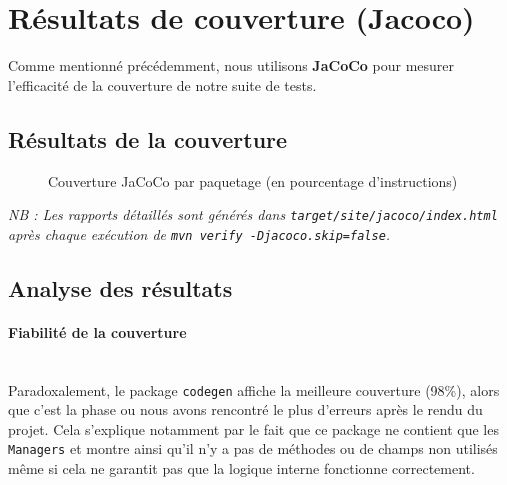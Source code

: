 \section{Résultats de couverture (Jacoco)}
\noindent
Comme mentionné précédemment, nous utilisons \textbf{JaCoCo} pour mesurer l'efficacité de la couverture de notre suite de tests. 

\subsection{Résultats de la couverture}
\begin{figure}[H]
    \centering
    \caption{Couverture JaCoCo par paquetage (en pourcentage d'instructions)}
\end{figure}



\noindent
\textit{NB : Les rapports détaillés sont générés dans \texttt{target/site/jacoco/index.html} après chaque exécution de \texttt{mvn verify -Djacoco.skip=false}.}

\subsection{Analyse des résultats}

\paragraph*{Fiabilité de la couverture} \mbox{} \\
\noindent
Paradoxalement, le package \texttt{codegen} affiche la meilleure couverture (98\%), alors que c'est la phase ou nous avons rencontré le plus d'erreurs après le rendu du projet. Cela s'explique notamment par le fait que ce package ne contient que les \texttt{Managers} et montre ainsi qu'il n'y a pas de méthodes ou de champs non utilisés même si cela ne garantit pas que la logique interne fonctionne correctement.

